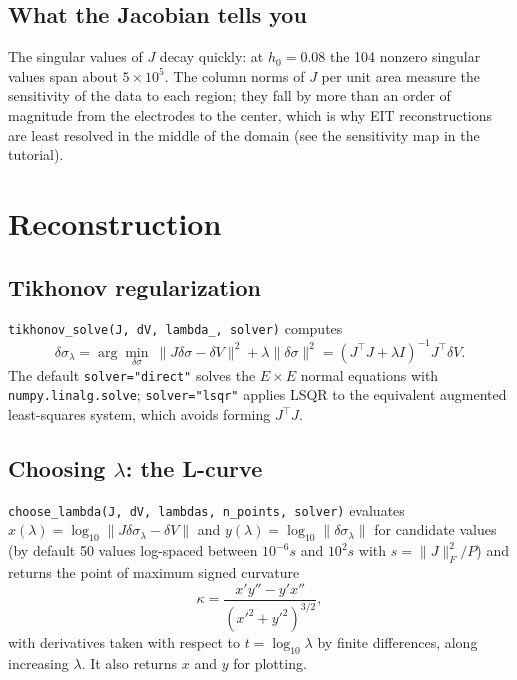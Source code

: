 \documentclass[11pt,a4paper]{article}
\newcommand{\code}[1]{\texttt{#1}}
\newcommand{\dsig}{\delta\sigma}
\newcommand{\dV}{\delta V}
\begin{document}
\subsection{What the Jacobian tells you}

The singular values of $J$ decay quickly: at $h_0 = 0.08$ the 104 nonzero
singular values span about $5\times10^{5}$. The column norms of $J$ per unit
area measure the sensitivity of the data to each region; they fall by more
than an order of magnitude from the electrodes to the center, which is why
EIT reconstructions are least resolved in the middle of the domain (see the
sensitivity map in the tutorial).

\section{Reconstruction}

\subsection{Tikhonov regularization}

\code{tikhonov\_solve(J, dV, lambda\_, solver)} computes
\begin{equation}\label{eq:tikhonov}
  \dsig_\lambda = \arg\min_{\dsig}\ \|J\dsig-\dV\|^2 + \lambda\|\dsig\|^2
  = (J^\top J + \lambda I)^{-1}J^\top\dV .
\end{equation}
The default \code{solver="direct"} solves the $E\times E$ normal equations
with \code{numpy.linalg.solve}; \code{solver="lsqr"} applies LSQR to the
equivalent augmented least-squares system, which avoids forming
$J^\top J$.

\subsection{Choosing $\lambda$: the L-curve}

\code{choose\_lambda(J, dV, lambdas, n\_points, solver)} evaluates
$x(\lambda)=\log_{10}\|J\dsig_\lambda-\dV\|$ and
$y(\lambda)=\log_{10}\|\dsig_\lambda\|$ for candidate values (by default 50
values log-spaced between $10^{-6}s$ and $10^{2}s$ with
$s=\|J\|_F^2/P$) and returns the point of maximum signed
curvature~\cite{Hansen1992,HansenOLeary1993}
\begin{equation}\label{eq:curvature}
  \kappa = \frac{x'y''-y'x''}{(x'^2+y'^2)^{3/2}},
\end{equation}
with derivatives taken with respect to $t=\log_{10}\lambda$ by finite
differences, along increasing $\lambda$. It also returns $x$ and $y$ for
plotting.
\end{document}
